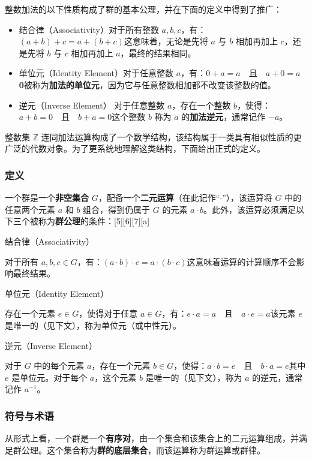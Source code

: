整数加法的以下性质构成了群的基本公理，并在下面的定义中得到了推广：  
\begin{itemize}
\item 结合律（Associativity）对于所有整数 \(a, b, c\)，有：\((a + b) + c = a + (b + c)\)这意味着，无论是先将 \(a\) 与 \(b\) 相加再加上 \(c\)，还是先将 \(b\) 与 \(c\) 相加再加上 \(a\)，最终的结果相同。  
\item 单位元（Identity Element）对于任意整数 \(a\)，有：\(0 + a = a \quad \text{且} \quad a + 0 = a\) \textbf{0}被称为\textbf{加法的单位元}，因为它与任意整数相加都不改变该整数的值。  
\item 逆元（Inverse Element） 对于任意整数 \(a\)，存在一个整数 \(b\)，使得： \(a + b = 0 \quad \text{且} \quad b + a = 0\)这个整数 \(b\) 称为 \(a\) 的\textbf{加法逆元}，通常记作 \(-a\)。  
\end{itemize}
整数集 \(\mathbb{Z}\) 连同加法运算构成了一个数学结构，该结构属于一类具有相似性质的更广泛的代数对象。为了更系统地理解这类结构，下面给出正式的定义。
\subsubsection{定义} 
一个群是一个\textbf{非空集合 }\( G \)，配备一个\textbf{二元运算}（在此记作“\( \cdot \)”），该运算将 \( G \) 中的任意两个元素 \( a \) 和 \( b \) 组合，得到仍属于 \( G \) 的元素 \( a \cdot b \)。此外，该运算必须满足以下三个被称为\textbf{群公理}的条件：[5][6][7][a]  

结合律（Associativity） 

对于所有 \( a, b, c \in G \)，有：\((a \cdot b) \cdot c = a \cdot (b \cdot c)\)这意味着运算的计算顺序不会影响最终结果。  

单位元（Identity Element） 

存在一个元素 \( e \in G \)，使得对于任意 \( a \in G \)，有：\(e \cdot a = a \quad \text{且} \quad a \cdot e = a\)该元素 \( e \) 是唯一的（见下文），称为单位元（或中性元）。  

逆元（Inverse Element）

对于 \( G \) 中的每个元素 \( a \)，存在一个元素 \( b \in G \)，使得：\(a \cdot b = e \quad \text{且} \quad b \cdot a = e\)其中 \( e \) 是单位元。对于每个 \( a \)，这个元素 \( b \) 是唯一的（见下文），称为 \( a \) 的逆元，通常记作 \( a^{-1} \)。
\subsubsection{符号与术语} 
从形式上看，一个群是一个\textbf{有序对}，由一个集合和该集合上的二元运算组成，并满足群公理。这个集合称为\textbf{群的底层集合}，而该运算称为群运算或群律。  

